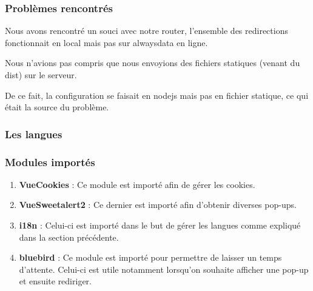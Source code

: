 \subsubsection{Problèmes rencontrés}
\begin{flushleft}
Nous avons rencontré un souci avec notre router, l’ensemble des redirections fonctionnait en local mais pas sur alwaysdata en ligne.
\end{flushleft}
\begin{flushleft}
Nous n’avions pas compris que nous envoyions des fichiers statiques (venant du dist) sur le serveur.
\end{flushleft}
\begin{flushleft}
De ce fait, la configuration se faisait en nodejs mais pas en fichier statique, ce qui était la source du problème.
\end{flushleft}

\subsubsection{Les langues}

\subsubsection{Modules importés}
\begin{enumerate}[-]
\item \textbf{VueCookies} :\newline
Ce module est importé afin de gérer les cookies.
\item \textbf{VueSweetalert2} :\newline
Ce dernier est importé afin d'obtenir diverses pop-ups.
\item \textbf{i18n} :\newline
Celui-ci est importé dans le but de gérer les langues comme expliqué dans la section précédente.
\item \textbf{bluebird} :\newline
Ce module est importé pour permettre de laisser un temps d'attente.\newline
Celui-ci est utile notamment lorsqu'on souhaite afficher une pop-up et ensuite rediriger.
\end{enumerate} 
